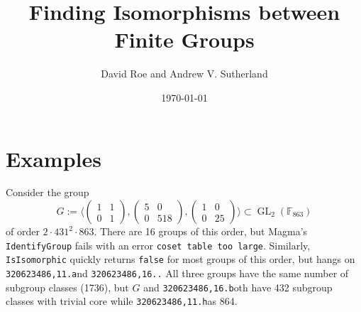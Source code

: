\documentclass{article}
\title{Finding Isomorphisms between Finite Groups}
\author{David Roe and Andrew V. Sutherland}
\date{\today}
\newcommand{\gid}[2]{\texttt{#1.#2}}
\newcommand{\FF}{\mathbb{F}}
\DeclareMathOperator{\GL}{GL}
\begin{document}
\maketitle

\section{Examples}

Consider the group
$$G := \langle \begin{pmatrix} 1 & 1 \\ 0 & 1 \end{pmatrix}, \begin{pmatrix} 5 & 0 \\ 0 & 518 \end{pmatrix}, \begin{pmatrix} 1 & 0 \\ 0 & 25 \end{pmatrix} \rangle \subset \GL_2(\FF_{863})$$
of order $2 \cdot 431^2 \cdot 863$.  There are 16 groups of this order, but Magma's \texttt{IdentifyGroup} fails with an error \texttt{coset table too large}.  Similarly, \texttt{IsIsomorphic} quickly returns \texttt{false} for most groups of this order, but hangs on \gid{320623486,11} and \gid{320623486,16}.  All three groups have the same number of subgroup classes (1736), but $G$ and \gid{320623486,16} both have 432 subgroup classes with trivial core while \gid{320623486,11} has 864.
\end{document}
